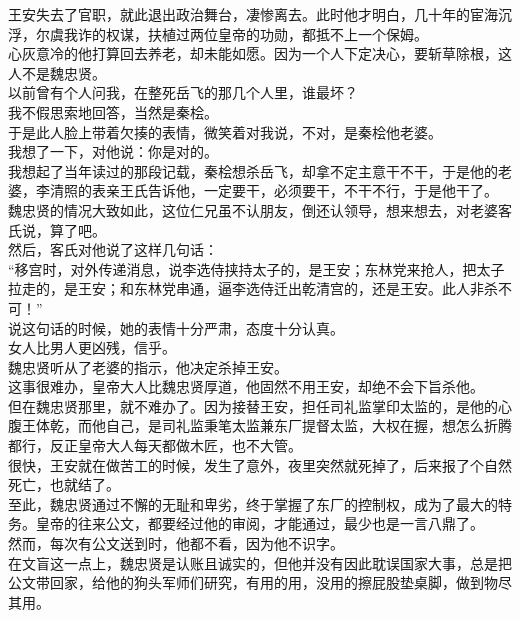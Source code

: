\begin{multicols}{\theparacolNo}
王安失去了官职，就此退出政治舞台，凄惨离去。此时他才明白，几十年的宦海沉浮，尔虞我诈的权谋，扶植过两位皇帝的功勋，都抵不上一个保姆。\\

心灰意冷的他打算回去养老，却未能如愿。因为一个人下定决心，要斩草除根，这人不是魏忠贤。\\

以前曾有个人问我，在整死岳飞的那几个人里，谁最坏？\\

我不假思索地回答，当然是秦桧。\\

于是此人脸上带着欠揍的表情，微笑着对我说，不对，是秦桧他老婆。\\

我想了一下，对他说：你是对的。\\

我想起了当年读过的那段记载，秦桧想杀岳飞，却拿不定主意干不干，于是他的老婆，李清照的表亲王氏告诉他，一定要干，必须要干，不干不行，于是他干了。\\

魏忠贤的情况大致如此，这位仁兄虽不认朋友，倒还认领导，想来想去，对老婆客氏说，算了吧。\\

然后，客氏对他说了这样几句话：\\

“移宫时，对外传递消息，说李选侍挟持太子的，是王安；东林党来抢人，把太子拉走的，是王安；和东林党串通，逼李选侍迁出乾清宫的，还是王安。此人非杀不可！”\\

说这句话的时候，她的表情十分严肃，态度十分认真。\\

女人比男人更凶残，信乎。\\

魏忠贤听从了老婆的指示，他决定杀掉王安。\\

这事很难办，皇帝大人比魏忠贤厚道，他固然不用王安，却绝不会下旨杀他。\\

但在魏忠贤那里，就不难办了。因为接替王安，担任司礼监掌印太监的，是他的心腹王体乾，而他自己，是司礼监秉笔太监兼东厂提督太监，大权在握，想怎么折腾都行，反正皇帝大人每天都做木匠，也不大管。\\

很快，王安就在做苦工的时候，发生了意外，夜里突然就死掉了，后来报了个自然死亡，也就结了。\\

至此，魏忠贤通过不懈的无耻和卑劣，终于掌握了东厂的控制权，成为了最大的特务。皇帝的往来公文，都要经过他的审阅，才能通过，最少也是一言八鼎了。\\

然而，每次有公文送到时，他都不看，因为他不识字。\\

在文盲这一点上，魏忠贤是认账且诚实的，但他并没有因此耽误国家大事，总是把公文带回家，给他的狗头军师们研究，有用的用，没用的擦屁股垫桌脚，做到物尽其用。\\

\ifnum{}
	\end{multicols}
\fi
\newpage
